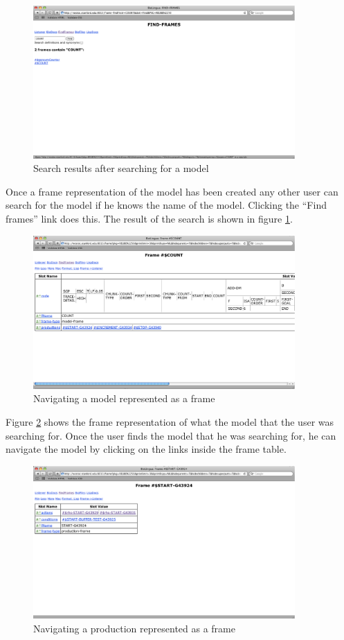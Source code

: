 \begin{figure}[htp]
  \centering
  \includegraphics[width=100mm]{SearchForModel}
  \caption{Search results after searching for a model}
  \label{SearchForModel}
\end{figure}

Once a frame representation of the model has been created any other
user can search for the model if he knows the name of the
model. Clicking the ``Find frames'' link does this. The result of the search
is shown in figure \ref{SearchForModel}.

\begin{figure}[htp]
  \centering
  \includegraphics[width=100mm]{NavigateFrame}
  \caption{Navigating a model represented as a frame}
  \label{NavigateFrame}
\end{figure}

Figure \ref{NavigateFrame} shows the frame representation of what the
model that the user was searching for. Once the user finds the model
that he was searching for, he can navigate the model by clicking on
the links inside the frame table.

\begin{figure}[htp]
  \centering
  \includegraphics[width=100mm]{NavigatingAProduction}
  \caption{Navigating a production represented as a frame}
  \label{NavigatingAProduction}
\end{figure}

